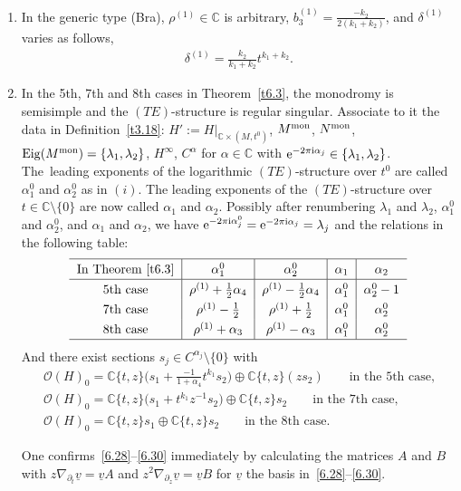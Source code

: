 \documentclass[10pt,a4paper]{amsart}
\numberwithin{equation}{section}
\numberwithin{figure}{section}
\newcommand{\C}{{\mathbb C}}
\newcommand{\OO}{{\mathcal O}}
\newcommand{\uuuu}{\underline}
\newcommand{\paa}{\partial}
\newcommand{\nnn}{\nabla}
\DeclareMathOperator{\Eig}{Eig}
\begin{document}
\begin{Remarks}
\begin{enumerate}
\item[$(iii)$] In the generic type (Bra), $\rho^{(1)}\in\C$ is arbitrary,
$b_3^{(1)}=\frac{-k_2}{2(k_1+k_2)}$, and $\delta^{(1)}$
varies as follows,
\begin{eqnarray}\label{6.26}
\delta^{(1)}= \frac{k_2}{k_1+k_2}t^{k_1+k_2}.
\end{eqnarray}

\item[$(iv)$] In the 5th, 7th and 8th cases in Theorem~\ref{t6.3},
the monodromy is semisimple and the $(TE)$-structure is regular singular.
Associate to it the data in Definition~\ref{t3.18}:
$H':=H|_{\C\times (M,t^0)}$, $M^{\rm mon}$, $N^{\rm mon}$,
$\Eig(M^{\rm mon})=\{\lambda_1,\lambda_2\}$, $H^\infty$, $C^{\alpha}$ for
$\alpha\in\C$ with ${\rm e}^{-2\pi {\rm i} \alpha_j}\in\{\lambda_1,\lambda_2\}$.
The~leading exponents of the logarithmic $(TE)$-structure
over $t^0$ are called $\alpha_1^0$ and $\alpha_2^0$ as in $(i)$.
The leading exponents of the $(TE)$-structure over
$t\in \C\setminus\{0\}$ are now called $\alpha_1$ and $\alpha_2$.
Possibly after renumbering $\lambda_1$ and $\lambda_2$,
$\alpha_1^0$ and $\alpha_2^0$, and $\alpha_1$ and $\alpha_2$,
we have ${\rm e}^{-2\pi {\rm i}\alpha_j^0}={\rm e}^{-2\pi {\rm i}\alpha_j}=\lambda_j$
and the relations in the following table:
\begin{gather}\label{6.27}
\def\arraystretch{1.3}
\begin{tabular}{c|c|c|c|c}
\hline
In Theorem~\ref{t6.3} & $\alpha_1^0$ & $\alpha_2^0$&$\alpha_1$ &$\alpha_2$
\\ \hline
5th case &$\rho^{(1)}+\frac{1}{2}\alpha_4$ &$\rho^{(1)}-\frac{1}{2}\alpha_4$
&$\alpha_1^0$ & $\alpha_2^0-1$
\\
7th case & $\rho^{(1)}-\frac{1}{2}$ &
$\rho^{(1)}+\frac{1}{2}$ & $\alpha_1^0$ & $\alpha_2^0$
\\
8th case &$\rho^{(1)}+\alpha_3$ &$\rho^{(1)}-\alpha_3$ & $\alpha_1^0$ & $\alpha_2^0$
\\
\hline
\end{tabular}
\end{gather}
And there exist sections $s_j\in C^{\alpha_j}\setminus\{0\}$ with
\begin{gather}
\OO(H)_0= \C\{t,z\}\bigg(s_1+\frac{-1}{1+\alpha_4}t^{k_1}s_2\bigg)
\oplus \C\{t,z\}(zs_2)
\qquad \text{in the 5th case,} \label{6.28}\\
\OO(H)_0= \C\{t,z\}\big(s_1+t^{k_1}z^{-1}s_2\big)
\oplus \C\{t,z\}s_2
\qquad \text{in the 7th case,} \label{6.29}\\[.5ex]
\OO(H)_0= \C\{t,z\}s_1
\oplus \C\{t,z\}s_2
\qquad \text{in the 8th case.}\label{6.30}
\end{gather}
{\sloppy
One confirms~\eqref{6.28}--\eqref{6.30}
immediately by calculating the matrices
$A$ and $B$ with \mbox{$z\nnn_{\paa_t}\uuuu{v}=\uuuu{v}A$}
and $z^2\nnn_{\paa_z}\uuuu{v}=\uuuu{v}B$ for
$\uuuu{v}$ the basis in~\eqref{6.28}--\eqref{6.30}.

}
\end{enumerate}
\end{Remarks}
\end{document}
